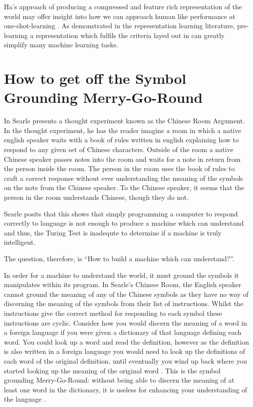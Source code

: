 Ha's approach of producing a compressed and feature rich representation of the world \cite{ha2018world, ha2018recurrent} may offer insight into how we can approach human like performance at one-shot-learning \cite{vinyals2016matching}. As demonstrated in the representation learning literature, pre-learning a representation which fulfils the criteria layed out in \cite{repRev} can greatly simplify many machine learning tasks.


\section{How to get off the Symbol Grounding Merry-Go-Round} 
In \cite{searle1980minds} Searle presents a thought experiment known as the Chinese Room Argument. In the thought experiment, he has the reader imagine a room in which a native english speaker waits with a book of rules written in english explaining how to respond to any given set of Chinese characters. Outside of the room a native Chinese speaker passes notes into the room and waits for a note in return from the person inside the room. The person in the room uses the book of rules to craft a correct response without ever understanding the meaning of the symbols on the note from the Chinese speaker. To the Chinese speaker, it seems that the person in the room understands Chinese, though they do not.

Searle posits that this shows that simply programming a computer to respond correctly to language is not enough to produce a machine which can understand and thus, the Turing Test \cite{turing2009computing} is inadequte to determine if a machine is truly intelligent.

The question, therefore, is ``How to build a machine which can understand?''.

In order for a machine to understand the world, it must ground the symbols it manipulates within its program. In Searle's Chinese Room, the English speaker cannot ground the meaning of any of the Chinese symbols as they have no way of discerning the meaning of the symbols from their list of instructions. Whilst the instructions give the correct method for responding to each symbol these instructions are cyclic. Consider how you would discern the meaning of a word in a foreign language if you were given a dictionary of that language defining each word. You could look up a word and read the definition, however as the definition is also written in a foreign language you would need to look up the definitions of each word of the original definition, until eventually you wind up back where you started looking up the meaning of the original word \cite{cangelosi2000robotic}. This is the symbol grounding  Merry-Go-Round: without being able to discern the meaning of at least one word in the dictionary, it is useless for enhancing your understanding of the language \cite{harnad1990symbol}.

